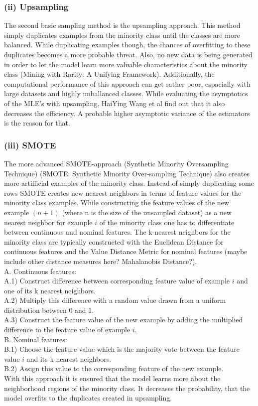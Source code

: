 \documentclass[12pt,titlepage]{article}
\begin{document}
\subsubsection*{(ii) Upsampling}

The second basic sampling method is the upsampling approach. This method simply duplicates examples from the minority class until the classes are more balanced.
While duplicating examples though, the chances of overfitting to these duplicates becomes a more probable threat.
Also, no new data is being generated in order to let the model learn more valuable characteristics about the minority class (Mining with Rarity: A Unifying Framework).
Additionally, the computational performance of this approach can get rather poor, espacially with large datasets and highly imballanced classes. While evaluating the
asymptotics of the MLE's with upsampling, HaiYing Wang et al find out that it also decreases the efficiency. A probable higher asymptotic variance of the estimators
is the reason for that. \\


\subsubsection*{(iii) SMOTE}

The more advanced SMOTE-approach (Synthetic Minority Oversampling Technique) (SMOTE: Synthetic Minority Over-sampling Technique) also creates more artifficial examples of
the minority class. Instead of simply duplicating some rows SMOTE creates new nearest neighbors in terms of feature values for the minority class examples. 
While constructing the feature values of the new example $(n + 1)$ (where n is the size of the unsampled dataset) as a new nearest neighbor for example $i$ of the
minority class one has to differentiate between continuous and nominal features. The k-nearest neighbors for the minority class are typically constructed with the Euclidean
Distance for continuous features and the Value Distance Metric for nominal features (maybe include other distance measures here? Mahalanobis Distance?).\\
A. Continuous features: \\
A.1) Construct difference between corresponding feature value of example $i$ and one of its k nearest neighbors. \\
A.2) Multiply this difference with a random value drawn from a uniform distribution between 0 and 1. \\
A.3) Construct the feature value of the new example by adding the multiplied difference to the feature value of example $i$. \\
B. Nominal features: \\
B.1) Choose the feature value which is the majority vote between the feature value $i$ and its k nearest neighbors. \\
B.2) Assign this value to the corresponding feature of the new example. \\
With this approach it is ensured that the model learns more about the neighborhood regions of the minority class. It decreases the probability, that the model overfits to the
duplicates created in upsampling. \\
\end{document}
